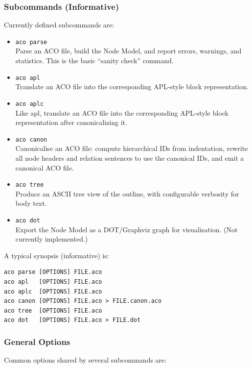 \documentclass[11pt]{article}
\begin{document}
\subsubsection*{Subcommands (Informative)}

Currently defined subcommands are:

\begin{itemize}[leftmargin=2em]
  \item \texttt{aco parse} \\
        Parse an ACO file, build the Node Model, and report errors, warnings, and statistics. This is the basic ``sanity check'' command.
  \item \texttt{aco apl} \\
        Translate an ACO file into the corresponding APL-style block representation.
  \item \texttt{aco aplc} \\
        Like apl, translate an ACO file into the corresponding APL-style block representation after canonicalizing it.
  \item \texttt{aco canon} \\
        Canonicalise an ACO file: compute hierarchical IDs from indentation, rewrite all node headers and relation sentences to use the canonical IDs, and emit a canonical ACO file.
  \item \texttt{aco tree} \\
        Produce an ASCII tree view of the outline, with configurable verbosity for body text.
  \item \texttt{aco dot} \\
        Export the Node Model as a DOT/Graphviz graph for visualisation. (Not currently implemented.)
\end{itemize}

A typical synopsis (informative) is:

\begin{verbatim}
aco parse [OPTIONS] FILE.aco
aco apl   [OPTIONS] FILE.aco
aco aplc  [OPTIONS] FILE.aco
aco canon [OPTIONS] FILE.aco > FILE.canon.aco
aco tree  [OPTIONS] FILE.aco
aco dot   [OPTIONS] FILE.aco > FILE.dot
\end{verbatim}

\subsubsection*{General Options}

Common options shared by several subcommands are:
\end{document}
